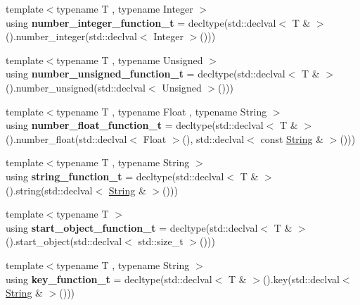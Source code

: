 \begin{DoxyCompactItemize}
{\footnotesize template$<$typename T , typename Integer $>$ }\\using {\bfseries number\+\_\+integer\+\_\+function\+\_\+t} = decltype(std\+::declval$<$ T \& $>$().number\+\_\+integer(std\+::declval$<$ Integer $>$()))
\item 
\mbox{\label{namespacenlohmann_1_1detail_a74da7b17bda76f65d276feb18209c913}} 
{\footnotesize template$<$typename T , typename Unsigned $>$ }\\using {\bfseries number\+\_\+unsigned\+\_\+function\+\_\+t} = decltype(std\+::declval$<$ T \& $>$().number\+\_\+unsigned(std\+::declval$<$ Unsigned $>$()))
\item 
\mbox{\label{namespacenlohmann_1_1detail_ad42df56e913abe26ed556e0e92f386f4}} 
{\footnotesize template$<$typename T , typename Float , typename String $>$ }\\using {\bfseries number\+\_\+float\+\_\+function\+\_\+t} = decltype(std\+::declval$<$ T \& $>$().number\+\_\+float(std\+::declval$<$ Float $>$(), std\+::declval$<$ const \hyperlink{structString}{String} \& $>$()))
\item 
\mbox{\label{namespacenlohmann_1_1detail_a27c3fc3bd42ac406f763184aa8ae4cb0}} 
{\footnotesize template$<$typename T , typename String $>$ }\\using {\bfseries string\+\_\+function\+\_\+t} = decltype(std\+::declval$<$ T \& $>$().string(std\+::declval$<$ \hyperlink{structString}{String} \& $>$()))
\item 
\mbox{\label{namespacenlohmann_1_1detail_a5fff1e6dcaabd367d9b1109a5682f9d4}} 
{\footnotesize template$<$typename T $>$ }\\using {\bfseries start\+\_\+object\+\_\+function\+\_\+t} = decltype(std\+::declval$<$ T \& $>$().start\+\_\+object(std\+::declval$<$ std\+::size\+\_\+t $>$()))
\item 
\mbox{\label{namespacenlohmann_1_1detail_a44869ca9f422b260625d78e4e8121559}} 
{\footnotesize template$<$typename T , typename String $>$ }\\using {\bfseries key\+\_\+function\+\_\+t} = decltype(std\+::declval$<$ T \& $>$().key(std\+::declval$<$ \hyperlink{structString}{String} \& $>$()))

\end{DoxyCompactItemize}
